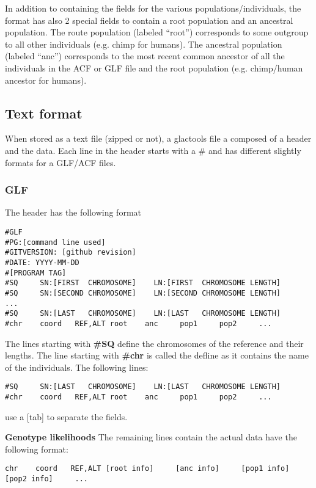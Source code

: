 \documentclass[a4paper]{article}
\begin{document}
\noindent In addition to containing the fields for the various populations/individuals, the format  has also 2 special fields to contain a root population and an ancestral population.  The route population (labeled  ``root'') corresponds to some outgroup to all other individuals (e.g. chimp for humans).  The ancestral population (labeled  ``anc'')  corresponds to the most recent common ancestor of all the individuals in the ACF or GLF file and the root population (e.g. chimp/human ancestor for humans).
\subsection{Text format}


When stored as a text file (zipped or not), a glactools file a composed of a header and the data. Each line in the header starts with a \# and has different slightly formats for a GLF/ACF files.

\subsubsection{GLF} 
\label{text:glf}
\noindent The header has the following format

\begin{verbatim}
#GLF
#PG:[command line used]
#GITVERSION: [github revision]
#DATE: YYYY-MM-DD
#[PROGRAM TAG]
#SQ     SN:[FIRST  CHROMOSOME]    LN:[FIRST  CHROMOSOME LENGTH]
#SQ     SN:[SECOND CHROMOSOME]    LN:[SECOND CHROMOSOME LENGTH]
...
#SQ     SN:[LAST   CHROMOSOME]    LN:[LAST   CHROMOSOME LENGTH]
#chr    coord   REF,ALT root    anc     pop1     pop2     ...
\end{verbatim}


\noindent The lines starting with {\bf \#SQ} define the chromosomes of the reference and their lengths. The line starting with {\bf \#chr} is called the defline as it contains the name of the individuals. The following lines:

\begin{verbatim}
#SQ     SN:[LAST   CHROMOSOME]    LN:[LAST   CHROMOSOME LENGTH]
#chr    coord   REF,ALT root    anc     pop1     pop2     ...
\end{verbatim}

\noindent use a [tab] to separate the fields. 

\noindent \textbf{Genotype likelihoods}
\noindent The remaining lines contain the actual data have the following format:

\begin{verbatim}
chr    coord   REF,ALT [root info]     [anc info]     [pop1 info]     [pop2 info]     ...
\end{verbatim}
\end{document}
